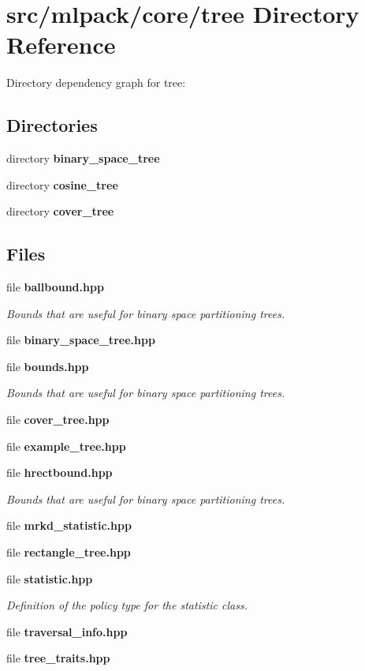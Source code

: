 \section{src/mlpack/core/tree Directory Reference}
\label{dir_4aa60ae374a0cb1df2b77a4723eecc54}
Directory dependency graph for tree\-:
\subsection*{Directories}
\begin{DoxyCompactItemize}
\item 
directory {\bf binary\-\_\-space\-\_\-tree}
\item 
directory {\bf cosine\-\_\-tree}
\item 
directory {\bf cover\-\_\-tree}
\end{DoxyCompactItemize}
\subsection*{Files}
\begin{DoxyCompactItemize}
\item 
file {\bf ballbound.\-hpp}
\begin{DoxyCompactList}\small\item\em Bounds that are useful for binary space partitioning trees. \end{DoxyCompactList}\item 
file {\bf binary\-\_\-space\-\_\-tree.\-hpp}
\item 
file {\bf bounds.\-hpp}
\begin{DoxyCompactList}\small\item\em Bounds that are useful for binary space partitioning trees. \end{DoxyCompactList}\item 
file {\bf cover\-\_\-tree.\-hpp}
\item 
file {\bf example\-\_\-tree.\-hpp}
\item 
file {\bf hrectbound.\-hpp}
\begin{DoxyCompactList}\small\item\em Bounds that are useful for binary space partitioning trees. \end{DoxyCompactList}\item 
file {\bf mrkd\-\_\-statistic.\-hpp}
\item 
file {\bf rectangle\-\_\-tree.\-hpp}
\item 
file {\bf statistic.\-hpp}
\begin{DoxyCompactList}\small\item\em Definition of the policy type for the statistic class. \end{DoxyCompactList}\item 
file {\bf traversal\-\_\-info.\-hpp}
\item 
file {\bf tree\-\_\-traits.\-hpp}
\end{DoxyCompactItemize}
